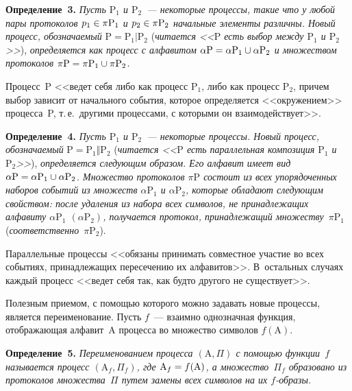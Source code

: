 \begin{multicols}{2}
    \medskip
    
    \noindent
    \textbf{Определение~3.} \textit{Пусть $\mathrm{P}_1$  и 
$\mathrm{P}_2$~--- некоторые процессы, такие что у любой пары 
протоколов $p_1\hm\in \pi \mathrm{P}_1$ и $p_2\hm\in \pi\mathrm{P}_2$ 
начальные элементы различны. Новый процесс, обозначаемый}
    $    \mathrm{P}=\mathrm{P}_1\vert \mathrm{P}_2
    $
(\textit{читается <<$\mathrm{P}$ есть выбор между  $\mathrm{P}_1$  и $\mathrm{P}_2$>>}), \textit{определяется как 
процесс с алфавитом $\alpha \mathrm{P}\hm=\alpha \mathrm{P}_1\cup 
\alpha\mathrm{P}_2$ и множеством протоколов 
$\pi\mathrm{P}\hm=\pi\mathrm{P}_1\cup \pi\mathrm{P}_2$.}
    
    Процесс~P <<ведет себя либо как процесс P$_1$, либо как процесс P$_2$, 
причем выбор зависит от начального события, которое определяется 
<<окружением>> процесса~P, т.\,е.\ другими процессами, с которыми он 
взаимодействует>>.
    
    \medskip
    
    \noindent
    \textbf{Определение~4.} \textit{Пусть $\mathrm{P}_1$  и $\mathrm{P}_2$~--- некоторые 
процессы. Новый процесс, обозначаемый}
    $
    \mathrm{P}=\mathrm{P}_1\Vert \mathrm{P}_2
    $
(\textit{читается <<$\mathrm{P}$ есть параллельная композиция $\mathrm{P}_1$ и~$\mathrm{P}_2$>>}), 
\textit{определяется следующим образом. Его алфавит имеет вид $\alpha 
\mathrm{P}\hm=\alpha\mathrm{P}_1\cup \alpha\mathrm{P}_2$. Множество 
протоколов $\pi\mathrm{P}$ состоит из всех упорядоченных наборов 
событий из множеств $\alpha\mathrm{P}_1$ и $\alpha\mathrm{P}_2$, 
которые обладают следующим свойством: после удаления из набора всех 
символов, не принадлежащих алфавиту $\alpha\mathrm{P}_1$ 
$(\alpha\mathrm{P}_2)$, получается протокол, принадлежащий 
множеству}~$\pi\mathrm{P}_1$ (\textit{соответственно}~$\pi\mathrm{P}_2$).
    
    Параллельные процессы <<обязаны принимать совместное участие во 
всех событиях, принадлежащих пересечению их алфавитов>>. В~остальных 
случаях каждый процесс <<ведет себя так, как будто другого не 
существует>>.
    
    Полезным приемом, с помощью которого можно задавать новые 
процессы, является переименование. Пусть $f$~--- взаимно однозначная 
функция, отображающая алфавит~A процесса во множество символов 
$f(\mathrm{A})$.
    
    \medskip
    
    \noindent
    \textbf{Определение~5.} \textit{Переименованием процесса 
$(\mathrm{A},\Pi)$ с помощью функции~$f$ называется процесс 
$(\mathrm{A}_f,\Pi_f)$, где $\mathrm{A}_{f}\hm=f(\mathrm{A})$, а 
множество~$\Pi_f$ образовано из протоколов множества~$\Pi$ путем 
замены всех символов на их $f$-об\-разы.}
    

\end{multicols}
